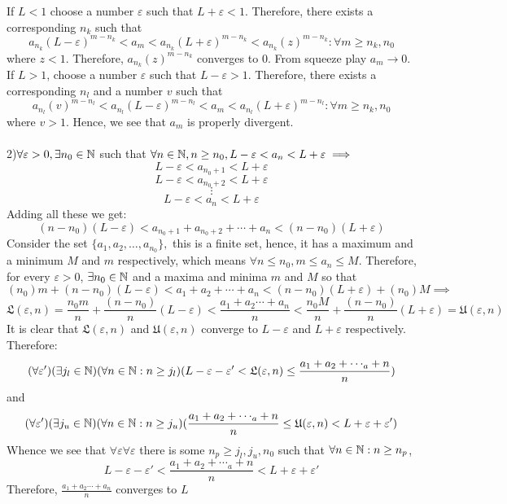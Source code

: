 \documentclass[../Main.tex]{subfiles}
\begin{document}
{If $L<1$ choose a number $\varepsilon$ such that $L+\varepsilon <1$. Therefore, there exists a corresponding $n_k$ such that $$a_{n_k}(L-\varepsilon)^{m-{n_k}} < a_m<a_{n_k}(L+\varepsilon)^{m-{n_k}}< a_{n_k}(z)^{m-n_k} : \forall m \geq n_k,n_0 $$ where $z<1$. Therefore, $a_{n_k}(z)^{m-n_k}$ converges to $0$. From squeeze play $a_m \to 0$.\\
If $L>1$, choose a number $\varepsilon$ such that $L-\varepsilon>1$. Therefore, there exists a corresponding $n_l$ and a number $v$ such that $$a_{n_l}(v)^{m-n_{l}} < a_{n_l}(L-\varepsilon)^{m-{n_l}} < a_m<a_{n_l}(L+\varepsilon)^{m-{n_l}}: \forall m \geq n_k,n_0 $$ where $v>1$. Hence, we see that $a_m$ is properly divergent.\\\\
2)$\forall \varepsilon>0, \exists n_0 \in \mathbb N$ such that $\forall n \in \mathbb N, n\geq n_0, L-\varepsilon<a_n<L+\varepsilon \implies$
$$L-\varepsilon < a_{n_0+1}<L+\varepsilon $$
$$L-\varepsilon < a_{n_0+2}<L+\varepsilon $$
$$\vdots$$
$$L-\varepsilon < a_{n}<L+\varepsilon $$
Adding all these we get:
$$(n-n_0)(L-\varepsilon)<a_{n_0+1}+a_{n_0+2}+\cdots+a_n <(n-n_0)(L+\varepsilon)$$
Consider the set $\{a_1,a_2, \dots, a_{n_0}\},$ this is a finite set, hence, it has a maximum and a minimum $M$ and $m$ respectively, which means $\forall n \leq n_0, m\leq a_n \leq M$. Therefore, for every $\varepsilon>0$, $\exists n_0 \in \mathbb N$ and a maxima and minima $m$ and $M$ so that $$(n_0)m+(n-n_0)(L-\varepsilon)<a_{1}+a_{2}+\cdots+a_n <(n-n_0)(L+\varepsilon)+(n_0)M \implies$$
$$\mathfrak{L}(\varepsilon,n)=\frac{n_0 m}{n}+\frac{(n-n_0)}{n}(L-\varepsilon)< \frac{a_1+a_2\cdots+a_n}{n}<\frac{n_0 M}{n}+\frac{(n-n_0)}{n}(L+\varepsilon)=\mathfrak{U}(\varepsilon,n) $$ It is clear that $\mathfrak{L}(\varepsilon,n)$ and $\mathfrak{U}(\varepsilon,n)$ converge to $L-\varepsilon$ and $L+\varepsilon$ respectively. Therefore:
$$(\forall \varepsilon')( \exists j_l \in \mathbb N) (\forall n \in \mathbb N: n \geq j_l)(L-\varepsilon-\varepsilon'<\mathfrak{L}(\varepsilon,n) \leq \frac{a_1+a_2+\cdots_a+n}{n})$$
and
$$(\forall \varepsilon')( \exists j_u \in \mathbb N) (\forall n \in \mathbb N: n \geq j_u)(\frac{a_1+a_2+\cdots_a+n}{n} \leq \mathfrak{U}(\varepsilon,n)<L+\varepsilon+\varepsilon')$$ Whence we see that $\forall \varepsilon \forall \varepsilon$ there is some $n_p \geq j_l, j_u, n_0$ such that $\forall n \in \mathbb N: n \geq n_p$, $$L-\varepsilon-\varepsilon'<\frac{a_1+a_2+\cdots_a+n}{n}<L+\varepsilon+\varepsilon' $$ Therefore, $\frac{a_1+a_2 \cdots +a_n}{n}$ converges to $L$\\\\
}
\end{document}
